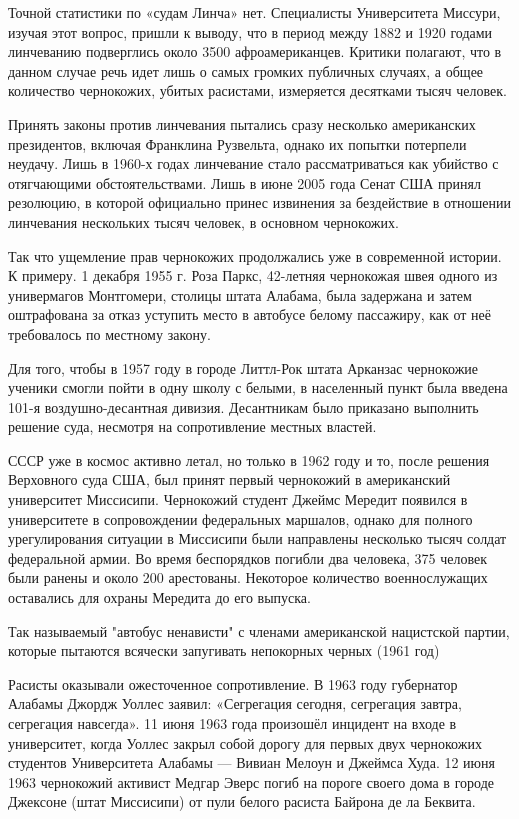 Точной статистики по «судам Линча» нет. Специалисты Университета Миссури,
изучая этот вопрос, пришли к выводу, что в период между 1882 и 1920 годами
линчеванию подверглись около 3500 афроамериканцев. Критики полагают, что в
данном случае речь идет лишь о самых громких публичных случаях, а общее
количество чернокожих, убитых расистами, измеряется десятками тысяч человек.

Принять законы против линчевания пытались сразу несколько американских
президентов, включая Франклина Рузвельта, однако их попытки потерпели неудачу.
Лишь в 1960-х годах линчевание стало рассматриваться как убийство с отягчающими
обстоятельствами. Лишь в июне 2005 года Сенат США принял резолюцию, в которой
официально принес извинения за бездействие в отношении линчевания нескольких
тысяч человек, в основном чернокожих.

Так что ущемление прав чернокожих продолжались уже в современной истории. К
примеру. 1 декабря 1955 г. Роза Паркс, 42-летняя чернокожая швея одного из
универмагов Монтгомери, столицы штата Алабама, была задержана и затем
оштрафована за отказ уступить место в автобусе белому пассажиру, как от неё
требовалось по местному закону.

Для того, чтобы в 1957 году в городе Литтл-Рок штата Арканзас чернокожие
ученики смогли пойти в одну школу с белыми, в населенный пункт была введена
101-я воздушно-десантная дивизия. Десантникам было приказано выполнить решение
суда, несмотря на сопротивление местных властей.

СССР уже в космос активно летал, но только в 1962 году и то, после решения
Верховного суда США, был принят первый чернокожий в американский университет
Миссисипи. Чернокожий студент Джеймс Мередит появился в университете в
сопровождении федеральных маршалов, однако для полного урегулирования ситуации
в Миссисипи были направлены несколько тысяч солдат федеральной армии. Во время
беспорядков погибли два человека, 375 человек были ранены и около 200
арестованы. Некоторое количество военнослужащих оставались для охраны Мередита
до его выпуска.

Так называемый "автобус ненависти" с членами американской нацистской партии,
которые пытаются всячески запугивать непокорных черных (1961 год)

Расисты оказывали ожесточенное сопротивление. В 1963 году губернатор Алабамы
Джордж Уоллес заявил: «Сегрегация сегодня, сегрегация завтра, сегрегация
навсегда». 11 июня 1963 года произошёл инцидент на входе в университет, когда
Уоллес закрыл собой дорогу для первых двух чернокожих студентов Университета
Алабамы — Вивиан Мелоун и Джеймса Худа. 12 июня 1963 чернокожий активист Медгар
Эверс погиб на пороге своего дома в городе Джексоне (штат Миссисипи) от пули
белого расиста Байрона де ла Беквита.

